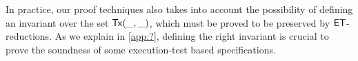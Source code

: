 In practice, our proof techniques also takes into account the possibility of defining an invariant over the set $\mathsf{Tx}(\_, \_)$, which 
must be proved to be preserved by $\mathsf{ET}$-reductions. As we explain in \cref{app:?}, defining the right invariant 
is crucial to prove the soundness of some execution-test based specifications.



